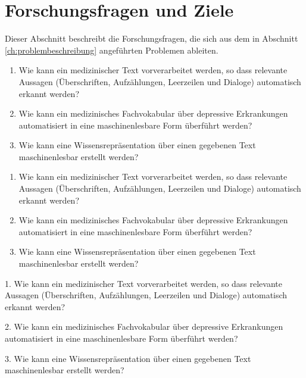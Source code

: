 \chapter{Forschungsfragen und Ziele}

Dieser Abschnitt beschreibt die Forschungsfragen, die sich aus dem in Abschnitt \ref{ch:problembeschreibung} angeführten Problemen ableiten.


\begin{enumerate}[label=FF\arabic*]
\item Wie kann ein medizinischer Text vorverarbeitet werden, so dass relevante Aussagen (Überschriften, Aufzählungen, Leerzeilen und Dialoge) automatisch erkannt werden?
\item Wie kann ein medizinisches Fachvokabular über depressive Erkrankungen automatisiert in eine maschinenlesbare Form überführt werden?
\item Wie kann eine Wissensrepräsentation über einen gegebenen Text maschinenlesbar erstellt werden?
\end{enumerate}

\begin{enumerate}[label=FZ \arabic*]
\item Wie kann ein medizinischer Text vorverarbeitet werden, so dass relevante Aussagen (Überschriften, Aufzählungen, Leerzeilen und Dialoge) automatisch erkannt werden?
\item Wie kann ein medizinisches Fachvokabular über depressive Erkrankungen automatisiert in eine maschinenlesbare Form überführt werden?
\item Wie kann eine Wissensrepräsentation über einen gegebenen Text maschinenlesbar erstellt werden?
\end{enumerate}

1.	Wie kann ein medizinischer Text vorverarbeitet werden, so dass relevante Aussagen (Überschriften, Aufzählungen, Leerzeilen und Dialoge) automatisch erkannt werden?


2.	Wie kann ein medizinisches Fachvokabular über depressive Erkrankungen automatisiert in eine maschinenlesbare Form überführt werden?


3.	Wie kann eine Wissensrepräsentation über einen gegebenen Text maschinenlesbar erstellt werden?


